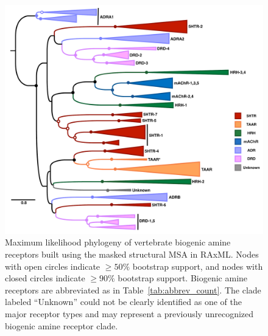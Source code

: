 \documentclass[fleqn,10pt]{wlpeerj}
\begin{document}
\newpage

\begin{figure}[htbp]
	\centerline{\includegraphics[width=18cm]{figures/vert_amine_tree.pdf}}
	\caption{\label{phylogeny} Maximum likelihood phylogeny of vertebrate biogenic amine receptors built using the masked structural MSA in RAxML. Nodes with open circles indicate $\geq 50\%$ bootstrap support, and nodes with closed circles indicate $\geq 90\%$ bootstrap support. Biogenic amine receptors are abbreviated as in Table~\ref{tab:abbrev_count}. The clade labeled ``Unknown'' could not be clearly identified as one of the major receptor types and may represent a previously unrecognized biogenic amine receptor clade.}
\end{figure}


\newpage
\end{document}
